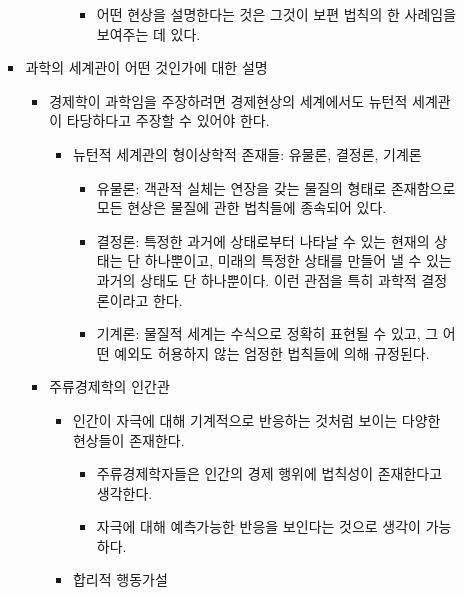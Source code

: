 \documentclass{report}
\begin{document}
\begin{itemize}
\begin{itemize}
\begin{itemize}
\begin{itemize}
\begin{itemize}
                    \begin{itemize}
                        \item 어떤 현상을 설명한다는 것은 그것이 보편 법칙의 한 사례임을 보여주는 데 있다.
                    \end{itemize}
                \end{itemize}
            \end{itemize}
            \item 과학의 세계관이 어떤 것인가에 대한 설명
            \begin{itemize}
                \item 경제학이 과학임을 주장하려면 경제현상의 세계에서도 뉴턴적 세계관이 타당하다고 주장할 수 있어야 한다.
                \begin{itemize}
                    \item 뉴턴적 세계관의 형이상학적 존재들: 유물론, 결정론, 기계론
                    \begin{itemize}
                        \item 유물론: 객관적 실체는 연장을 갖는 물질의 형태로 존재함으로 모든 현상은 물질에 관한 법칙들에 종속되어 있다.
                        \item 결정론: 특정한 과거에 상태로부터 나타날 수 있는 현재의 상태는 단 하나뿐이고, 미래의 특정한 상태를 만들어 낼 수 있는 과거의 상태도 단 하나뿐이다. 이런 관점을 특히 과학적 결정론이라고 한다.
                        \item 기계론: 물질적 세계는 수식으로 정확히 표현될 수 있고, 그 어떤 예외도 허용하지 않는 엄정한 법칙들에 의해 규정된다.
                    \end{itemize}
                \end{itemize}
                \item 주류경제학의 인간관
                \begin{itemize}
                    \item 인간이 자극에 대해 기계적으로 반응하는 것처럼 보이는 다양한 현상들이 존재한다.
                    \begin{itemize}
                        \item 주류경제학자들은 인간의 경제 행위에 법칙성이 존재한다고 생각한다.
                        \item 자극에 대해 예측가능한 반응을 보인다는 것으로 생각이 가능하다.
                    \end{itemize}
                    \item 합리적 행동가설
                    \begin{itemize}

\end{itemize}
\end{itemize}
\end{itemize}
\end{itemize}
\end{itemize}
\end{itemize}
\end{document}

